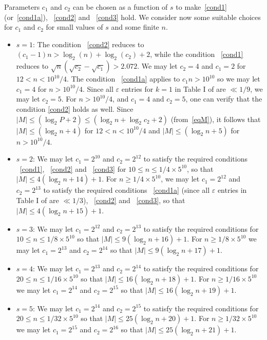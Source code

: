 Parameters $c_1$ and $c_2$ can be chosen as a function of $s$ to
make~\eqref{cond1} (or~\eqref{cond1a}), ~\eqref{cond2} and
~\eqref{cond3} hold. We consider now some suitable choices for
$c_1$ and $c_2$ for small values of $s$ and some finite $n$.
\begin{itemize}
\item $s=1$: The condition ~\eqref{cond2}
reduces to $(c_1-1)n > \log_2(n)+\log_2(c_2)+2$, while the condition
~\eqref{cond1} reduces to $\sqrt{n}(\sqrt{c_2}-\sqrt{c_1})> 2.072$.
We may let $c_2=4$ and $c_1=2$ for $12<n<10^{10}/4$. The condition
~\eqref{cond1a} applies to $c_1n>10^{10}$ so we may let $c_1=4$
 for $n>10^{10}/4$. Since all $\varepsilon$ entries for $k=1$ in Table I of \cite{rrumely}
 are $\ll 1/9$, we may let $c_2=5$. For $n> 10^{10}/4$, and $c_1=4$ and
 $c_2=5$, one can verify that the condition \eqref{cond2} holds as well.
 Since $|M| \leq (\log_2P+2)\leq (\log_2 n+\log_2 c_2+2)$ (from~\eqref{eqM}), it
 follows that $|M| \leq (\log_2n+4 )$ for $12<n<10^{10}/4$ and $|M| \leq (\log_2n+5 )$ for
 $n>10^{10}/4$.
 \item $s=2$: We may let $c_1=2^{10}$ and
$c_2=2^{12}$ to satisfy the required conditions ~\eqref{cond1},
~\eqref{cond2} and ~\eqref{cond3} for $10 \leq n\leq 1/4\times
5^{10}$, so that $|M| \leq 4(\log_2n+14)+1$. For $n \geq 1/4 \times
5^{10}$, we may let $c_1=2^{12}$ and $c_2=2^{13}$ to satisfy the
required conditions ~\eqref{cond1a} (since all $\varepsilon$ entries
in Table I of \cite{rrumely} are $\ll 1/3$), ~\eqref{cond2} and
~\eqref{cond3}, so that $|M| \leq 4(\log_2n+15)+1$. \item $s=3$: We
may let $c_1=2^{12}$ and $c_2=2^{13}$ to satisfy the required
conditions for $10 \leq n\leq 1/8\times 5^{10}$ so that $|M| \leq
9(\log_2n+16)+1$. For $n \geq 1/8\times 5^{10}$ we may let
$c_1=2^{13}$ and $c_2=2^{14}$ so that $|M| \leq 9(\log_2n+17)+1$.
\item $s=4$: We may let $c_1=2^{13}$ and $c_2=2^{14}$ to satisfy the
required conditions for $20 \leq n\leq 1/16\times 5^{10}$ so that
$|M| \leq 16(\log_2n+18)+1$. For  $ n\geq 1/16\times 5^{10}$ we may
let $c_1=2^{14}$ and $c_2=2^{15}$ so that $|M| \leq
16(\log_2n+19)+1$.\item $s=5$: We may let $c_1=2^{14}$ and
$c_2=2^{15}$ to satisfy the required conditions for $20 \leq n\leq
1/32\times 5^{10}$ so that $|M| \leq 25(\log_2n+20)+1$. For $n \geq
1/32\times 5^{10}$ we may let $c_1=2^{15}$ and $c_2=2^{16}$ so that
$|M| \leq 25(\log_2n+21)+1$.
\end{itemize}

